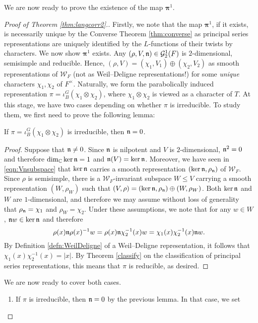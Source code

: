 We are now ready to prove the existence of the map $\bm\pi^1$.
\begin{proof}[Proof of Theorem \ref{thm:langcorr2}.]
    Firstly, we note that the map $\bm\pi^{1}$, if it exists, is necessarily unique by the Converse Theorem \ref{thm:converse} as principal series representations are uniquely identified by the $L$-functions of their twists by characters. We now show $\bm\pi^1$ exists. Any $(\rho,V,\mathfrak{n})\in\mathcal{G}_2^1(F)$ is $2$-dimensional, semisimple and reducible. Hence, $(\rho,V)=(\chi_1,V_1)\oplus(\chi_2,V_2)$ as smooth representations of $\mathcal{W}_F$ (not as Weil--Deligne representations!) for some \textit{unique} characters $\chi_1,\chi_2$ of $F^\times$. Naturally, we form the parabolically induced representation $\pi=\iota_B^G(\chi_1\otimes\chi_2)$, where $\chi_1\otimes\chi_2$ is viewed as a character of $T$. At this stage, we have two cases depending on whether $\pi$ is irreducible. To study them, we first need to prove the following lemma:
    \begin{lemma}
        If $\pi=\iota_B^G(\chi_1\otimes\chi_2)$ is irreducible, then $\mathfrak{n}=0$.
    \end{lemma}
    \begin{proof}
        Suppose that $\mathfrak{n}\neq 0$. Since $\mathfrak{n}$ is nilpotent and $V$ is $2$-dimensional, $\mathfrak{n}^2=0$ and therefore $\dim_{\mathbb{C}}\ker\mathfrak{n}=1$ and $\mathfrak{n}(V)=\ker\mathfrak{n}$. Moreover, we have seen in \eqref{eqn:Vnsubspace} that $\ker\mathfrak{n}$ carries a smooth representation $(\ker\mathfrak{n},\rho_{\mathfrak{n}})$ of $\mathcal{W}_F$. Since $\rho$ is semisimple, there is a $\mathcal{W}_F$-invariant subspace $W\leq V$ carrying a smooth representation $(W,\rho_W)$ such that $(V,\rho)=(\ker\mathfrak{n},\rho_{\mathfrak{n}})\oplus(W,\rho_W)$. Both $\ker\mathfrak{n}$ and $W$ are $1$-dimensional, and therefore we may assume without loss of generality that $\rho_{\mathfrak{n}}=\chi_1$ and $\rho_W=\chi_2$. Under these assumptions, we note that for any $w\in W$, $\mathfrak{n} w\in\ker\mathfrak{n}$ and therefore
        $$\rho(x)\mathfrak{n}\rho(x)^{-1}w=\rho(x)\mathfrak{n}\chi^{-1}_2(x)w=\chi_1(x)\chi_2^{-1}(x)\mathfrak{n} w.$$
        By Definition \ref{defn:WeilDeligne} of a Weil--Deligne representation, it follows that $\chi_1(x)\chi_2^{-1}(x)=|x|$. By Theorem \ref{classify} on the classification of principal series representations, this means that $\pi$ is reducible, as desired.
    \end{proof}
    We are now ready to cover both cases.
    \begin{enumerate}[(1)]
        \item If $\pi$ is irreducible, then $\mathfrak{n}=0$ by the previous lemma. In that case, we set 

\end{enumerate}
\end{proof}
